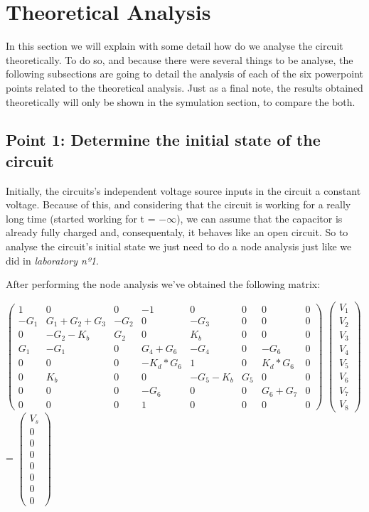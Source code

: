 \section{Theoretical Analysis}
\label{sec:analysis}

In this section we will explain with some detail how do we analyse the circuit theoretically. To do so, and because there were several things to be analyse, the following subsections are going to detail the analysis of each of the six powerpoint points related to the theoretical analysis. Just as a final note, the results obtained theoretically will only be shown in the symulation section, to compare the both.

\subsection{Point 1: Determine the initial state of the circuit}

Initially, the circuits's independent voltage source inputs in the circuit a constant voltage. Because of this, and considering that the circuit is working for a really long time (started working for t = $-\infty$), we can assume that the capacitor is already fully charged and, consequentaly, it behaves like an open circuit. So to analyse the circuit's initial state we just need to do a node analysis just like we did in \textit{laboratory nº1}. 

After performing the node analysis we've obtained the following matrix:

\setlength{\parskip}{4em}

$\begin{pmatrix}
1 & 0 & 0 & -1 & 0 & 0 & 0 & 0\\
-G_1 & G_1+G_2+G_3 & -G_2 & 0 & -G_3 & 0 & 0 & 0\\
0 & -G_2-K_b & G_2 & 0 & K_b & 0 & 0 & 0 \\
G_1 & -G_1 & 0 & G_4+G_6 & -G_4 & 0 & -G_6 & 0\\
0 & 0 & 0 & -K_d*G_6 & 1 & 0 & K_d*G_6 & 0 \\
0 & K_b & 0 & 0 & -G_5-K_b & G_5 & 0 & 0 \\
0 & 0 & 0 & -G_6 & 0 & 0 & G_6+G_7 & 0  \\ 
0 & 0 & 0 & 1 & 0 & 0 & 0 & 0
\end{pmatrix}$
$\begin{pmatrix}
V_1\\
V_2\\
V_3\\
V_4\\
V_5\\
V_6\\
V_7\\
V_8
\end{pmatrix}$
=
$\begin{pmatrix}
V_s\\
0\\
0\\
0\\
0\\
0\\
0\\
0
\end{pmatrix}$


